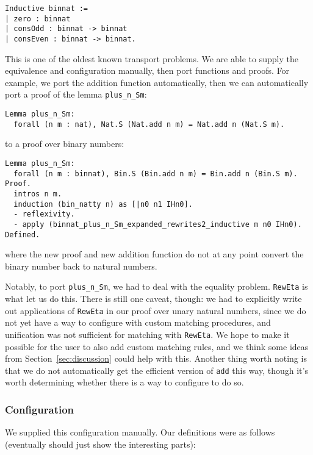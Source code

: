 \begin{lstlisting}
Inductive binnat :=
| zero : binnat
| consOdd : binnat -> binnat
| consEven : binnat -> binnat.
\end{lstlisting}
This is one of the oldest known transport problems.
We are able to supply the equivalence and configuration manually,
then port functions and proofs.
For example, we port the addition function automatically,
then we can automatically port a proof of the lemma \lstinline{plus_n_Sm}:

\begin{lstlisting}
Lemma plus_n_Sm:
  forall (n m : nat), Nat.S (Nat.add n m) = Nat.add n (Nat.S m).
\end{lstlisting}
to a proof over binary numbers:

\begin{lstlisting}
Lemma plus_n_Sm:
  forall (n m : binnat), Bin.S (Bin.add n m) = Bin.add n (Bin.S m).
Proof.
  intros n m.
  induction (bin_natty n) as [|n0 n1 IHn0].
  - reflexivity.
  - apply (binnat_plus_n_Sm_expanded_rewrites2_inductive m n0 IHn0).
Defined.
\end{lstlisting}
where the new proof and new addition function do not at any point convert
the binary number back to natural numbers.

Notably, to port \lstinline{plus_n_Sm}, we had to deal with the equality problem.
\lstinline{RewEta} is what let us do this.
There is still one caveat, though: we had to explicitly write out applications of \lstinline{RewEta}
in our proof over unary natural numbers, since we do not yet have a way to configure \toolname with custom
matching procedures, and unification was not sufficient for matching with \lstinline{RewEta}.
We hope to make it possible for the user to also add custom matching rules,
and we think some ideas from Section~\ref{sec:discussion} could help with this.
Another thing worth noting is that we do not automatically get the efficient version of \lstinline{add} this way,
though it's worth determining whether there is a way to configure \toolname to do so.

\subsubsection{Configuration}
We supplied this configuration manually.
Our definitions were as follows (eventually should just show the interesting parts):

